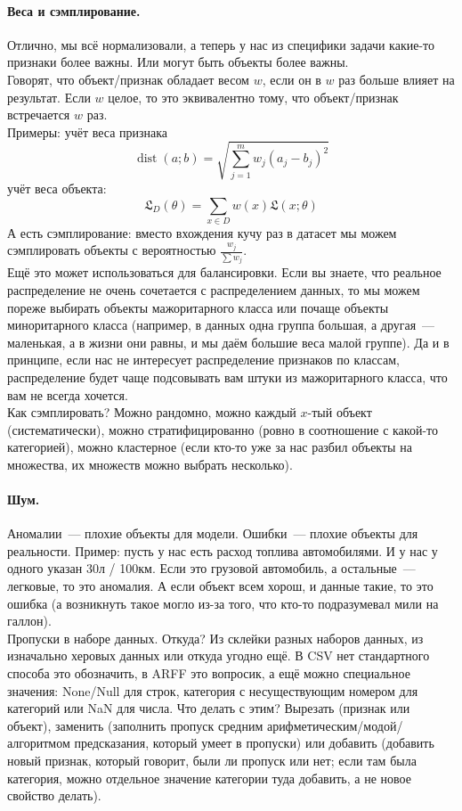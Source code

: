 \documentclass{article}
\begin{document}
    \paragraph{Веса и сэмплирование.}
    Отлично, мы всё нормализовали, а теперь у нас из специфики задачи какие-то признаки более важны. Или могут быть объекты более важны.\\
    Говорят, что объект/признак обладает весом $w$, если он в $w$ раз больше влияет на результат. Если $w$ целое, то это эквивалентно тому, что объект/признак встречается $w$ раз.\\
    Примеры: учёт веса признака
    \[
    \operatorname{dist}(a;b)=\sqrt{\sum\limits_{j=1}^mw_j(a_j-b_j)^2}
    \]
    учёт веса объекта:
    \[
    \mathfrak L_D(\theta)=\sum\limits_{x\in D}w(x)\mathfrak L(x;\theta)
    \]
    А есть сэмплирование: вместо вхождения кучу раз в датасет мы можем сэмплировать объекты с вероятностью $\frac{w_j}{\sum w_j}$.\\
    Ещё это может использоваться для балансировки. Если вы знаете, что реальное распределение не очень сочетается с распределением данных, то мы можем пореже выбирать объекты мажоритарного класса или почаще объекты миноритарного класса (например, в данных одна группа большая, а другая~--- маленькая, а в жизни они равны, и мы даём большие веса малой группе). Да и в принципе, если нас не интересует распределение признаков по классам, распределение будет чаще подсовывать вам штуки из мажоритарного класса, что вам не всегда хочется.\\
    Как сэмплировать? Можно рандомно, можно каждый $x$-тый объект (систематически), можно стратифицированно (ровно в соотношение с какой-то категорией), можно кластерное (если кто-то уже за нас разбил объекты на множества, их множеств можно выбрать несколько).
    \paragraph{Шум.}
    Аномалии~--- плохие объекты для модели. Ошибки~--- плохие объекты для реальности. Пример: пусть у нас есть расход топлива автомобилями. И у нас у одного указан 30л / 100км. Если это грузовой автомобиль, а остальные~--- легковые, то это аномалия. А если объект всем хорош, и данные такие, то это ошибка (а возникнуть такое могло из-за того, что кто-то подразумевал мили на галлон).\\
    Пропуски в наборе данных. Откуда? Из склейки разных наборов данных, из изначально херовых данных или откуда угодно ещё. В CSV нет стандартного способа это обозначить, в ARFF это вопросик, а ещё можно специальное значения: None/Null для строк, категория с несуществующим номером для категорий или NaN для числа. Что делать с этим? Вырезать (признак или объект), заменить (заполнить пропуск средним арифметическим/модой/алгоритмом предсказания, который умеет в пропуски) или добавить (добавить новый признак, который говорит, были ли пропуск или нет; если там была категория, можно отдельное значение категории туда добавить, а не новое свойство делать).
    \\\\\\
\end{document}
